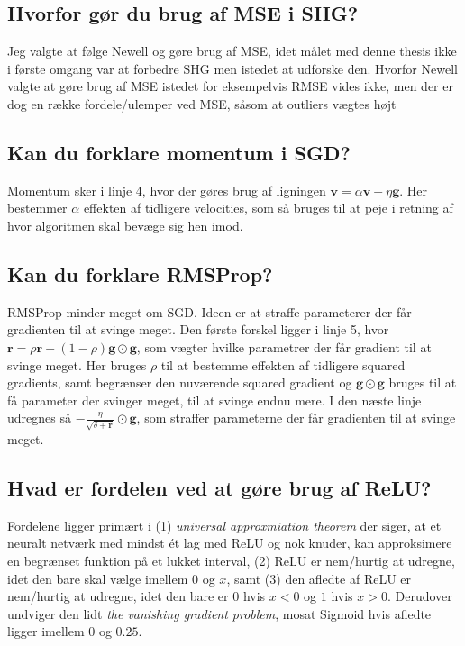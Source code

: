 \documentclass[a4paper]{article}
\begin{document}
\subsection{Hvorfor gør du brug af MSE i SHG?}
Jeg valgte at følge Newell og gøre brug af MSE, idet målet med denne thesis ikke i første omgang var at forbedre SHG men istedet at udforske den. Hvorfor Newell valgte at gøre brug af MSE istedet for eksempelvis RMSE vides ikke, men der er dog en række fordele/ulemper ved MSE, såsom at outliers vægtes højt

\subsection{Kan du forklare momentum i SGD?}
Momentum sker i linje 4, hvor der gøres brug af ligningen $\bm{v} = \alpha \bm{v} - \eta \bm{g}$. Her bestemmer $\alpha$ effekten af tidligere velocities, som så bruges til at peje i retning af hvor algoritmen skal bevæge sig hen imod.

\subsection{Kan du forklare RMSProp?}
RMSProp minder meget om SGD. Ideen er at straffe parameterer der får gradienten til at svinge meget. Den første forskel ligger i linje 5, hvor $\bm{r} = \rho \bm{r} + (1 - \rho) \bm{g} \odot \bm{g}$, som vægter hvilke parametrer der får gradient til at svinge meget. Her bruges $\rho$ til at bestemme effekten af tidligere squared gradients, samt begrænser den nuværende squared gradient og $\bm{g} \odot \bm{g}$ bruges til at få parameter der svinger meget, til at svinge endnu mere. I den næste linje udregnes så $- \frac{\eta}{\sqrt{\delta + \bm{r}}} \odot \bm{g}$, som straffer parameterne der får gradienten til at svinge meget.

\subsection{Hvad er fordelen ved at gøre brug af ReLU?}
Fordelene ligger primært i (1) \textit{universal approxmiation theorem} der siger, at et neuralt netværk med mindst ét lag med ReLU og nok knuder, kan approksimere en begrænset funktion på et lukket interval, (2) ReLU er nem/hurtig at udregne, idet den bare skal vælge imellem $0$ og $x$, samt (3) den afledte af ReLU er nem/hurtig at udregne, idet den bare er $0$ hvis $x < 0$ og $1$ hvis $x > 0$. Derudover undviger den lidt \textit{the vanishing gradient problem}, mosat Sigmoid hvis afledte ligger imellem $0$ og $0.25$.
\end{document}
